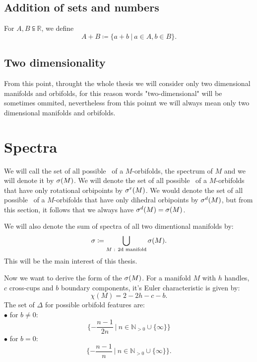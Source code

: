 \subsection{Addition of sets and numbers}
For $A, B \subseteqq \mathbb{R}$, we define 
\begin{equation}
A+B \coloneqq \{a+b\ |\ a \in A, b\in B\}.
\end{equation}

\subsection{Two dimensionality}
From this point, throught the whole thesis we will consider only two dimensional manifolds and 
orbifolds, for this reason words "two-dimensional" will be sometimes ommited, nevertheless 
from this poinnt we will always mean only two dimensional manifolds and orbifolds.  



\section{Spectra}\label{spectra}
We will call the set of all possible \Eoc\ of a $M$-orbifolds, the spectrum of $M$ and 
we will denote it by ${{\sigma}(M)}$. We will denote the set of all possible \Eoc\ of a $M$-orbifolds 
that have only rotational orbipoints by ${\sigma}^r(M)$. 
We would denote the set of all possible \Eoc\ of a $M$-orbifolds 
that have only dihedral orbipoints by ${\sigma}^d(M)$, but from this section, it follows that 
we always have ${\sigma}^d(M) = {{\sigma}(M)}$. 

We will also denote the sum of spectra of all two dimentional manifolds by:
\begin{equation}
{\sigma} \coloneqq \bigcup_{M\textrm{ : 2d manifold}} {{\sigma}(M)}.
\end{equation}
This will be the main interest of this thesis. 

Now we want to derive the form of the ${{\sigma}(M)}$.
For a manifold $M$ with $h$ handles, $c$ cross-cups and $b$ boundary components, it's 
Euler characteristic is given by:
\begin{equation}
\chi(M) = 2-2h-c-b.
\end{equation}
The set of $\Delta$ for possible orbifold features are:\\
$\bullet$ for $b\neq 0$:
\begin{equation}
\{-\frac{n-1}{2n}\ \big|\ n\in\mathbb{N}_{>0}\cup \{\infty\}\}
\end{equation}
$\bullet$ for $b = 0$:
\begin{equation}
\{-\frac{n-1}{n}\ \big|\ n\in\mathbb{N}_{>0}\cup \{\infty\}\}.
\end{equation} 

